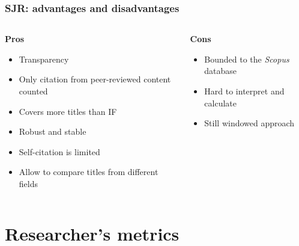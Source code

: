\documentclass{beamer}
\newcommand{\pros}{\item[{\textcolor[HTML]{3C8031}{\ding{51}}}]}
\newcommand{\cons}{\item[\textcolor{red}{\ding{54}}]}
\newcommand{\sco}{\textit{Scopus} }
\begin{document}
\begin{frame}
    \frametitle{SJR: advantages and disadvantages}
    \begin{columns}[T]
        \begin{column}{.5\textwidth}
            \centering \textbf{Pros}
            \begin{itemize}[<+->]
                \pros Transparency
                \pros Only citation from peer-reviewed content counted
                \pros Covers more titles than IF
                \pros Robust and stable
                \pros Self-citation is limited
                \pros Allow to compare titles from different fields
            \end{itemize}
        \end{column}
        \begin{column}{.5\textwidth}
            \centering \textbf{Cons}
            \begin{itemize}[<+->]
                \cons Bounded to the \sco database
                \cons Hard to interpret and calculate
                \cons Still windowed approach
            \end{itemize}
        \end{column}
    \end{columns}
\end{frame}

\section{Researcher's metrics}
\end{document}
